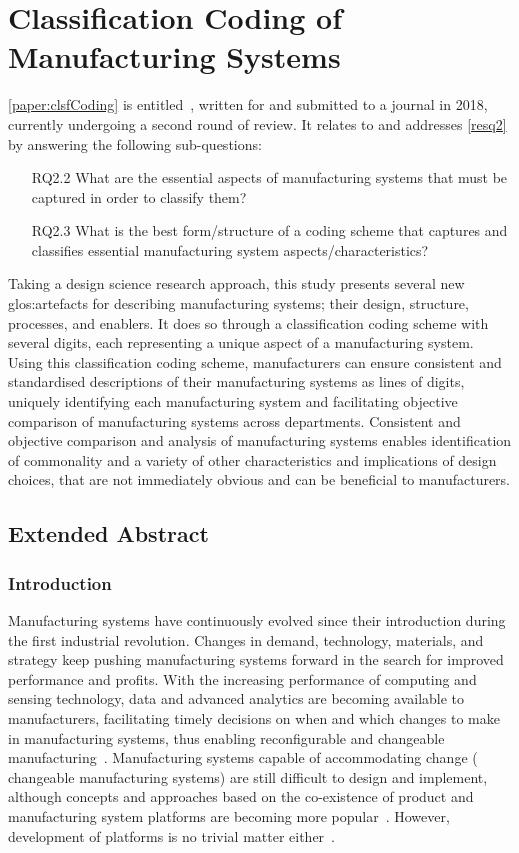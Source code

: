 \section{Classification Coding of Manufacturing Systems}\label{sec:PSCC}
\cref{paper:clsfCoding} is entitled~, written for and submitted to a journal in 2018, currently undergoing a second round of review.
It relates to and addresses \cref{resq2} by answering the following sub-questions:
\begin{enumerate}[leftmargin=3em]
  \item[RQ2.2]What are the essential aspects of manufacturing systems that must be captured in order to classify them?
  \item[RQ2.3]What is the best form/structure of a coding scheme that captures and classifies essential manufacturing system aspects/characteristics?
\end{enumerate}
Taking a design science research approach, this study presents several new \gls{glos:artefact}s for describing manufacturing systems; their design, structure, processes, and enablers.
It does so through a classification coding scheme with several digits, each representing a unique aspect of a manufacturing system.
Using this classification coding scheme, manufacturers can ensure consistent and standardised descriptions of their manufacturing systems as lines of digits, uniquely identifying each manufacturing system and facilitating objective comparison of manufacturing systems across departments.
Consistent and objective comparison and analysis of manufacturing systems enables identification of commonality and a variety of other characteristics and implications of design choices, that are not immediately obvious and can be beneficial to manufacturers.

\subsection{Extended Abstract}
\subsubsection*{Introduction}
Manufacturing systems have continuously evolved since their introduction during the first industrial revolution.
Changes in demand, technology, materials, and strategy keep pushing manufacturing systems forward in the search for improved performance and profits.
With the increasing performance of computing and sensing technology, data and advanced analytics are becoming available to manufacturers, facilitating timely decisions on when and which changes to make in manufacturing systems, thus enabling reconfigurable and changeable manufacturing~\parencite{ElMaraghySmartChange}.
Manufacturing systems capable of accommodating change (\ie{} changeable manufacturing systems) are still difficult to design and implement, although concepts and approaches based on the co-existence of product and manufacturing system platforms are becoming more popular~\parencite{MichaelisJohannesson,ElMaraghy2015407,ABBAS201851}.
However, development of platforms is no trivial matter either~\parencite{BossenPbCd,Andersen2017179}.

